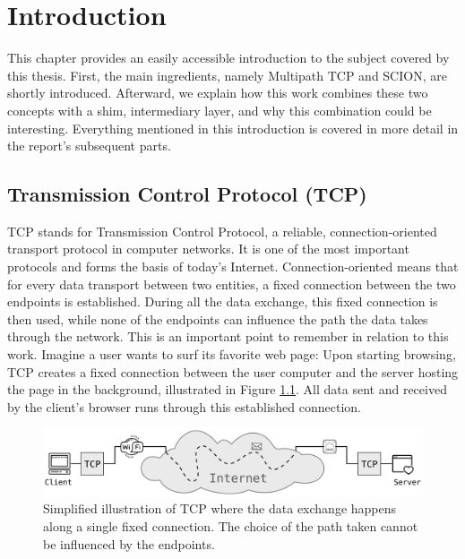 \newcommand{\package}{\emph}

\chapter{Introduction}
\label{chap:Introduction}

This chapter provides an easily accessible introduction to the subject covered by this thesis.  First, the main ingredients, namely Multipath TCP and SCION, are shortly introduced. Afterward, we explain how this work combines these two concepts with a shim, intermediary layer, and why this combination could be interesting. Everything mentioned in this introduction is covered in more detail in the report's subsequent parts.

\section{Transmission Control Protocol (TCP)}

TCP stands for Transmission Control Protocol, a reliable, connection-oriented transport protocol in computer networks. It is one of the most important protocols and forms the basis of today's Internet. Connection-oriented means that for every data transport between two entities, a fixed connection between the two endpoints is established. During all the data exchange, this fixed connection is then used, while none of the endpoints can influence the path the data takes through the network. This is an important point to remember in relation to this work. Imagine a user wants to surf its favorite web page: Upon starting browsing, TCP creates a fixed connection between the user computer and the server hosting the page in the background, illustrated in Figure \ref{fig:IntroTCP}. All data sent and received by the client's browser runs through this established connection.

\newpage

\begin{figure}[H]
	\begin{center}
		\def\svgwidth{1\textwidth}
		\includegraphics[scale=0.28]{../illustrations/introduction/TCPConnection.pdf}  
		\caption[Caption for the list of figures.]{Simplified illustration of TCP where the data exchange happens along a single fixed connection. The choice of the path taken cannot be influenced by the endpoints.}
		\label{fig:IntroTCP}
	\end{center}
\end{figure}

